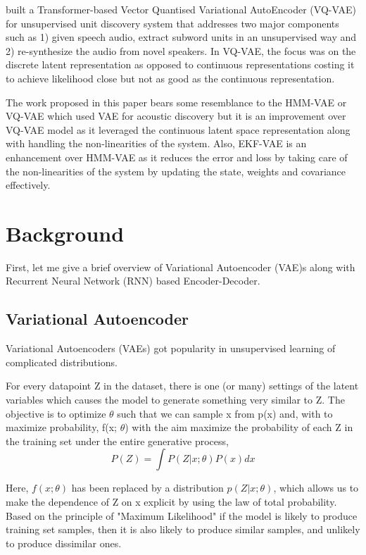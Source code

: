 \documentclass{article}
\begin{document}
\par
\cite{tjandra2020transformer} built a Transformer-based Vector Quantised Variational AutoEncoder (VQ-VAE) for unsupervised unit discovery system that addresses two major components such as 1) given speech audio, extract subword units in an unsupervised way and 2) re-synthesize the audio from novel speakers. In VQ-VAE, the focus was on the discrete latent representation as opposed to continuous representations costing it to achieve likelihood close but not as good as the continuous representation.

The work proposed in this paper bears some resemblance to the HMM-VAE \cite{Raj_2017} or VQ-VAE \cite{tjandra2020transformer}  which used VAE for acoustic discovery but it is an improvement over VQ-VAE model as it leveraged the continuous latent space representation along with handling the non-linearities of the system. Also, EKF-VAE is an enhancement over HMM-VAE as it reduces the error and loss by taking care of the non-linearities of the system by updating the state, weights and covariance effectively.

\section{Background}
\label{section:background}
First, let me give a brief overview of Variational Autoencoder (VAE)s along with Recurrent Neural Network (RNN) based Encoder-Decoder.

\subsection{Variational Autoencoder}
Variational Autoencoders \cite{Kingma2014} (VAEs) got popularity in unsupervised learning \cite{varadarajan-etal-2008-unsupervised} of complicated distributions.  

For every datapoint Z in the dataset, \cite{doersch2021tutorial} there is one (or many) settings of the latent variables which causes the model to generate something very similar to Z. The objective is to optimize $\theta$ such that we can sample x from p(x) and, with to maximize probability, f(x; $\theta$) with the aim maximize the probability of each Z in the training set under the entire generative process,
\begin{equation} \label{eq:vaeEq}
    P(Z) = \int P(Z | x; \theta)P(x) dx
\end{equation}

Here, $f(x; \theta)$ has been replaced by a distribution $p(Z | x; \theta)$, which allows us to make the dependence of Z on x explicit by using the law of total probability. Based on the principle of "Maximum Likelihood" if the model is likely to produce training set samples, then it is also likely to produce similar samples, and unlikely to produce dissimilar ones.  
\end{document}
